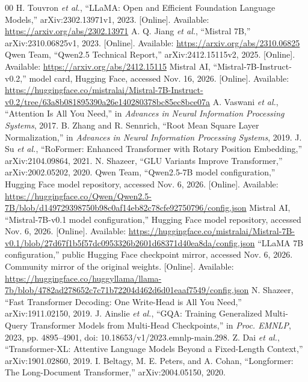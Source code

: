 \documentclass[conference]{IEEEtran}
\begin{document}
\begin{thebibliography}{00}
 H. Touvron \emph{et al.}, ``LLaMA: Open and Efficient Foundation Language Models,'' arXiv:2302.13971v1, 2023. [Online]. Available: \url{https://arxiv.org/abs/2302.13971}
 A. Q. Jiang \emph{et al.}, ``Mistral 7B,'' arXiv:2310.06825v1, 2023. [Online]. Available: \url{https://arxiv.org/abs/2310.06825}
 Qwen Team, ``Qwen2.5 Technical Report,'' arXiv:2412.15115v2, 2025. [Online]. Available: \url{https://arxiv.org/abs/2412.15115}
 Mistral AI, ``Mistral-7B-Instruct-v0.2,'' model card, Hugging Face, accessed Nov. 16, 2026. [Online]. Available: \url{https://huggingface.co/mistralai/Mistral-7B-Instruct-v0.2/tree/63a8b081895390a26e140280378bc85ec8bce07a}
 A. Vaswani \emph{et al.}, ``Attention Is All You Need,'' in \emph{Advances in Neural Information Processing Systems}, 2017.
 B. Zhang and R. Sennrich, ``Root Mean Square Layer Normalization,'' in \emph{Advances in Neural Information Processing Systems}, 2019.
 J. Su \emph{et al.}, ``RoFormer: Enhanced Transformer with Rotary Position Embedding,'' arXiv:2104.09864, 2021.
 N. Shazeer, ``GLU Variants Improve Transformer,'' arXiv:2002.05202, 2020.
 Qwen Team, ``Qwen2.5-7B model configuration,'' Hugging Face model repository, accessed Nov. 6, 2026. [Online]. Available: \url{https://huggingface.co/Qwen/Qwen2.5-7B/blob/d149729398750b98c0af14eb82c78cfe92750796/config.json}
 Mistral AI, ``Mistral-7B-v0.1 model configuration,'' Hugging Face model repository, accessed Nov. 6, 2026. [Online]. Available: \url{https://huggingface.co/mistralai/Mistral-7B-v0.1/blob/27d67f1b5f57dc0953326b2601d68371d40ea8da/config.json}
 ``LLaMA 7B configuration,'' public Hugging Face checkpoint mirror, accessed Nov. 6, 2026. Community mirror of the original weights. [Online]. Available: \url{https://huggingface.co/huggyllama/llama-7b/blob/4782ad278652c7c71b72204d462d6d01eaaf7549/config.json}
 N. Shazeer, ``Fast Transformer Decoding: One Write-Head is All You Need,'' arXiv:1911.02150, 2019.
 J. Ainslie \emph{et al.}, ``GQA: Training Generalized Multi-Query Transformer Models from Multi-Head Checkpoints,'' in \emph{Proc. EMNLP}, 2023, pp. 4895--4901, doi: 10.18653/v1/2023.emnlp-main.298.
 Z. Dai \emph{et al.}, ``Transformer-XL: Attentive Language Models Beyond a Fixed-Length Context,'' arXiv:1901.02860, 2019.
 I. Beltagy, M. E. Peters, and A. Cohan, ``Longformer: The Long-Document Transformer,'' arXiv:2004.05150, 2020.

\end{thebibliography}
\end{document}
